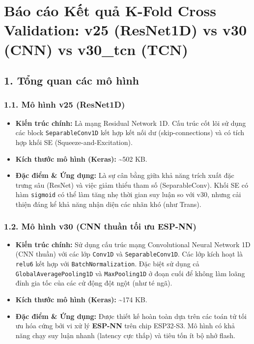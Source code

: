 \documentclass[12pt,a4paper]{article}
\providecommand{\tightlist}{\setlength{\itemsep}{0pt}\setlength{\parskip}{0pt}}
\begin{document}
\section{Báo cáo Kết quả K-Fold Cross Validation: v25 (ResNet1D) vs v30
(CNN) vs v30\_tcn
(TCN)}\label{buxe1o-cuxe1o-kux1ebft-quux1ea3-k-fold-cross-validation-v25-resnet1d-vs-v30-cnn-vs-v30_tcn-tcn}

\subsection{1. Tổng quan các mô
hình}\label{tux1ed5ng-quan-cuxe1c-muxf4-huxecnh}

\subsubsection{1.1. Mô hình v25
(ResNet1D)}\label{muxf4-huxecnh-v25-resnet1d}

\begin{itemize}
\tightlist
\item
  \textbf{Kiến trúc chính:} Là mạng Residual Network 1D. Cấu trúc cốt
  lõi sử dụng các block \texttt{SeparableConv1D} kết hợp kết nối dư
  (skip-connections) và có tích hợp khối SE (Squeeze-and-Excitation).
\item
  \textbf{Kích thước mô hình (Keras):} \textasciitilde502 KB.
\item
  \textbf{Đặc điểm \& Ứng dụng:} Là sự cân bằng giữa khả năng trích xuất
  đặc trưng sâu (ResNet) và việc giảm thiểu tham số (SeparableConv).
  Khối SE có hàm \texttt{sigmoid} có thể làm tăng nhẹ thời gian suy luận
  so với v30, nhưng cải thiện đáng kể khả năng nhận diện các nhãn khó
  (như Trans).
\end{itemize}

\subsubsection{1.2. Mô hình v30 (CNN thuần tối ưu
ESP-NN)}\label{muxf4-huxecnh-v30-cnn-thuux1ea7n-tux1ed1i-ux1b0u-esp-nn}

\begin{itemize}
\tightlist
\item
  \textbf{Kiến trúc chính:} Sử dụng cấu trúc mạng Convolutional Neural
  Network 1D (CNN thuần) với các lớp \texttt{Conv1D} và
  \texttt{SeparableConv1D}. Các lớp kích hoạt là \texttt{relu6} kết hợp
  với \texttt{BatchNormalization}. Đặc biệt sử dụng cả
  \texttt{GlobalAveragePooling1D} và \texttt{MaxPooling1D} ở đoạn cuối
  để không làm loãng đỉnh gia tốc của các cử động đột ngột (như té ngã).
\item
  \textbf{Kích thước mô hình (Keras):} \textasciitilde174 KB.
\item
  \textbf{Đặc điểm \& Ứng dụng:} Được thiết kế hoàn toàn dựa trên các
  toán tử tối ưu hóa cứng bởi vi xử lý \textbf{ESP-NN} trên chip
  ESP32-S3. Mô hình có khả năng chạy suy luận nhanh (latency cực thấp)
  và tiêu tốn ít bộ nhớ flash.
\end{itemize}
\end{document}
